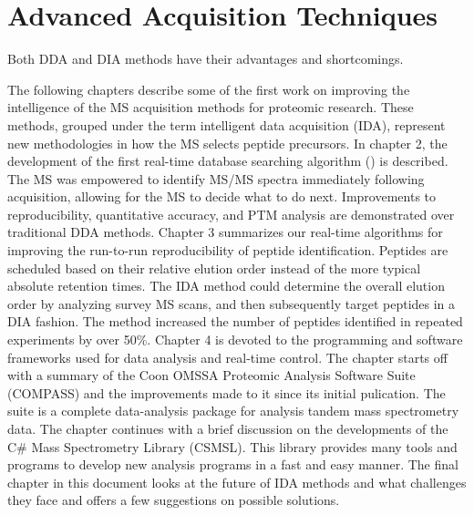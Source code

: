 \section{Advanced Acquisition Techniques}
Both DDA and DIA methods have their advantages and shortcomings. 

The following chapters describe some of the first work on improving the intelligence of the MS acquisition methods for proteomic research. These methods, grouped under the term intelligent data acquisition (IDA), represent new methodologies in how the MS selects peptide precursors. In chapter 2, the development of the first real-time database searching algorithm (\inseq{}) is described. The MS was empowered to identify MS/MS spectra immediately following acquisition, allowing for the MS to decide what to do next. Improvements to reproducibility, quantitative accuracy, and PTM analysis are demonstrated over traditional DDA methods. Chapter 3 summarizes our real-time algorithms for improving the run-to-run reproducibility of peptide identification. Peptides are scheduled based on their relative elution order instead of the more typical absolute retention times. The IDA method could determine the overall elution order by analyzing survey MS scans, and then subsequently target peptides in a DIA fashion. The method increased the number of peptides identified in repeated experiments by over 50\%. Chapter 4 is devoted to the programming and software frameworks used for data analysis and real-time control. The chapter starts off with a summary of the Coon OMSSA Proteomic Analysis Software Suite (COMPASS) and the improvements made to it since its initial pulication.\cite{compass} The suite is a complete data-analysis package for analysis tandem mass spectrometry data. The chapter continues with a brief discussion on the developments of the C\# Mass Spectrometry Library (CSMSL). This library provides many tools and programs to develop new analysis programs in a fast and easy manner. The final chapter in this document looks at the future of IDA methods and what challenges they face and offers a few suggestions on possible solutions.




